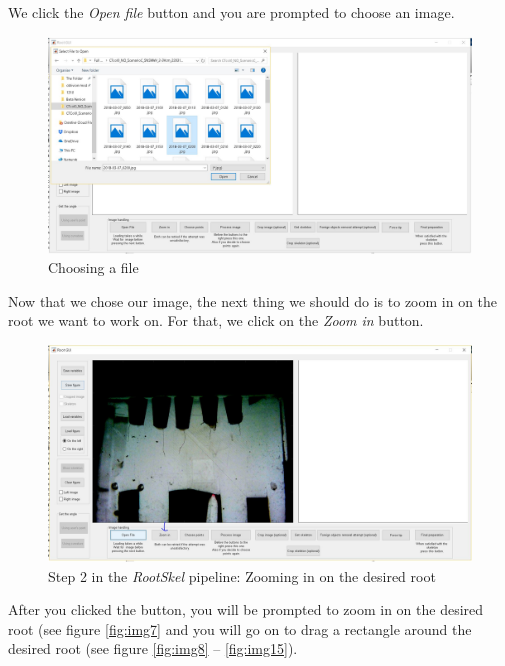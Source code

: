  We click the \textit{Open file} button and you are prompted to choose an image.
 \begin{figure}[H]
 	\centering
 	\includegraphics[width=\textwidth]{../Figures/manual/step2.jpg}
 	\caption{Choosing a file}
 	\label{fig:img5}
 \end{figure}
 
 Now that we chose our image, the next thing we should do is to zoom in on the root we want to work on. 
 For that, we click on the \textit{Zoom in} button.
 \begin{figure}[H]
 	\centering
 	\includegraphics[width=\textwidth]{../Figures/manual/step3.jpg}
 	\caption{Step 2 in the \textit{RootSkel} pipeline: Zooming in on the desired root}
 	\label{fig:img6}
 \end{figure}
 
 After you clicked the button, you will be prompted to zoom in on the desired root (see figure \ref{fig:img7}
 and you will go on to drag a rectangle around the desired root (see figure \ref{fig:img8} -- \ref{fig:img15}).
 	
